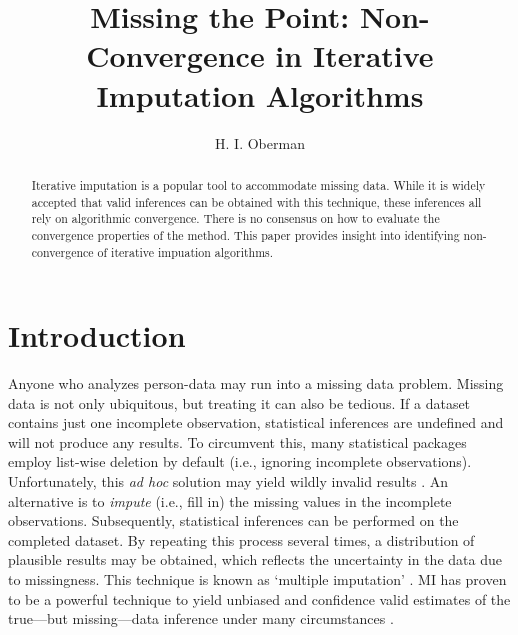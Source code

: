 \documentclass[Royal,times,sageh]{sagej}
\begin{document}
\title{Missing the Point: Non-Convergence in Iterative Imputation Algorithms}


\author{H. I. Oberman}




\begin{abstract}
Iterative imputation is a popular tool to accommodate missing data.
While it is widely accepted that valid inferences can be obtained with
this technique, these inferences all rely on algorithmic convergence.
There is no consensus on how to evaluate the convergence properties of
the method. This paper provides insight into identifying non-convergence
of iterative impuation algorithms.
\end{abstract}


\maketitle

\hypertarget{introduction}{%
\section{Introduction}\label{introduction}}

Anyone who analyzes person-data may run into a missing data problem.
Missing data is not only ubiquitous, but treating it can also be
tedious. If a dataset contains just one incomplete observation,
statistical inferences are undefined and will not produce any results.
To circumvent this, many statistical packages employ list-wise deletion
by default (i.e., ignoring incomplete observations). Unfortunately, this
\emph{ad hoc} solution may yield wildly invalid results \citep{buur18}.
An alternative is to \emph{impute} (i.e., fill in) the missing values in
the incomplete observations. Subsequently, statistical inferences can be
performed on the completed dataset. By repeating this process several
times, a distribution of plausible results may be obtained, which
reflects the uncertainty in the data due to missingness. This technique
is known as `multiple imputation' \citep[MI;][]{rubin76}. MI has proven
to be a powerful technique to yield unbiased and confidence valid
estimates of the true---but missing---data inference under many
circumstances \citep{buur18}.
\end{document}

